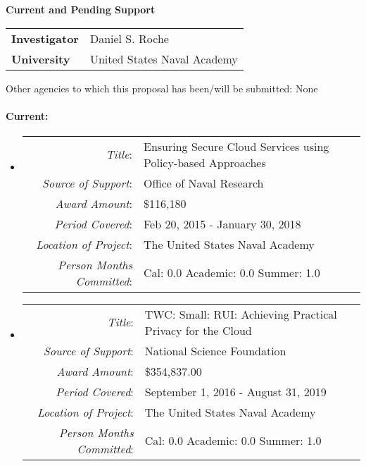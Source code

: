 \documentclass[10pt]{article}
\begin{document}
\begin{center}
{\Large \bf Current and Pending Support}\\
\end{center}

\begin{tabular}{l l}
{\bf Investigator} & Daniel S. Roche\\
{\bf University} & United States Naval Academy\\
\end{tabular}

\vspace{.25in}
Other agencies to which this proposal has been/will be submitted: None\\


\paragraph{Current:} 

\begin{itemize}
\item[]
  \begin{tabular} {r l}
    {\em Title}: & Ensuring Secure Cloud Services using Policy-based Approaches\\
    {\em Source of Support}: & Office of Naval Research\\
    {\em Award Amount}: & \$116,180\\
    {\em Period Covered}: & Feb 20, 2015 - January 30, 2018\\
    {\em Location of Project}: & The United States Naval Academy \\
    {\em Person Months Committed}: & Cal: 0.0 Academic: 0.0 Summer: 1.0\\
  \end{tabular}
\item[]
  \begin{tabular} {r l}
    {\em Title}: & TWC: Small: RUI: Achieving Practical Privacy for the
    Cloud \\
    {\em Source of Support}: & National Science Foundation \\
    {\em Award Amount}: & \$354,837.00\\
    {\em Period Covered}: & September 1, 2016 - August 31, 2019\\
    {\em Location of Project}: & The United States Naval Academy \\
    {\em Person Months Committed}: & Cal: 0.0 Academic: 0.0 Summer: 1.0\
  \end{tabular}

 
\end{itemize}
\end{document}
